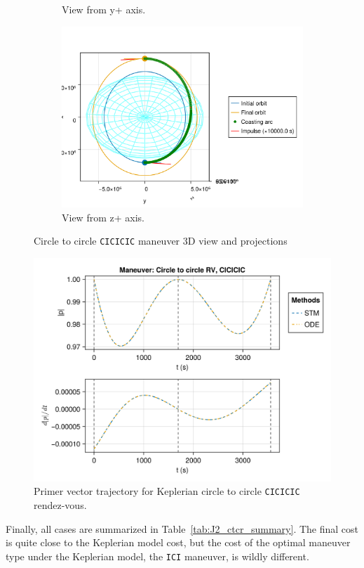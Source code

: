 \begin{figure}[htbp]
\begin{subfigure}{0.49\linewidth}
        \caption{View from y+ axis.}
    \end{subfigure}
    \begin{subfigure}{0.49\linewidth}
        \includegraphics[width=0.8\linewidth]{../results/j2/hohmann/CICICIC_z+.png}
        \caption{View from z+ axis.}
    \end{subfigure}
    \caption{Circle to circle \texttt{CICICIC} maneuver 3D view and projections}
    \label{fig:j2_c2c_CICICIC_figs}
\end{figure}

\begin{figure}[htbp]
    \centering
    \includegraphics[width=0.7\linewidth]{../results/j2/hohmann/CICICIC_primer_vector.png}
    \caption{Primer vector trajectory for Keplerian circle to circle \texttt{CICICIC} rendez-vous.}
    \label{fig:j2_c2c_CICICIC_pv}
\end{figure}

Finally, all cases are summarized in Table~\ref{tab:J2_ctcr_summary}. The final cost is quite close to the Keplerian model cost, but the cost of the optimal maneuver type under the Keplerian model, the \texttt{ICI} maneuver, is wildly different.

